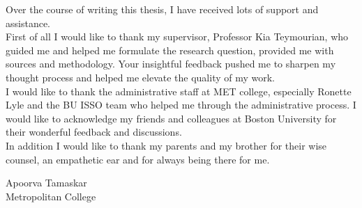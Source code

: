 Over the course of writing this thesis, I have received lots of support and assistance.\\
First of all I would like to thank my supervisor, Professor Kia Teymourian, who guided me and helped me formulate the research question, provided me with sources and methodology. Your insightful feedback pushed me to sharpen my thought process and helped me elevate the quality of my work.\\
I would like to thank the administrative staff at MET college, especially Ronette Lyle and the BU ISSO team who helped me through the administrative process.
I would like to acknowledge my friends and colleagues at Boston University for their wonderful feedback and discussions.\\
In addition I would like to thank my parents and my brother for their wise counsel, an empathetic ear and for always being there for me.
\vskip 1in

\noindent
Apoorva Tamaskar\\
Metropolitan College
